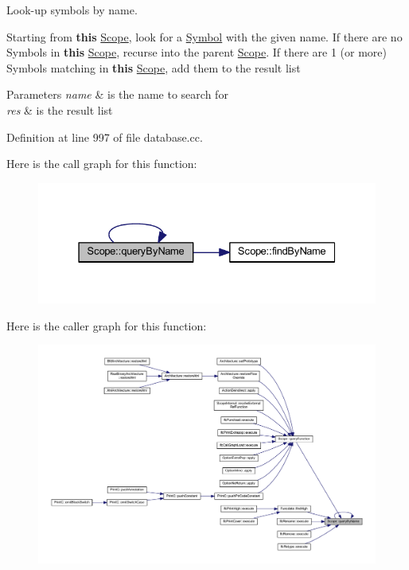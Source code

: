 Look-\/up symbols by name. 

Starting from {\bfseries{this}} \mbox{\hyperlink{class_scope}{Scope}}, look for a \mbox{\hyperlink{class_symbol}{Symbol}} with the given name. If there are no Symbols in {\bfseries{this}} \mbox{\hyperlink{class_scope}{Scope}}, recurse into the parent \mbox{\hyperlink{class_scope}{Scope}}. If there are 1 (or more) Symbols matching in {\bfseries{this}} \mbox{\hyperlink{class_scope}{Scope}}, add them to the result list 
\begin{DoxyParams}{Parameters}
{\em name} & is the name to search for \\
\hline
{\em res} & is the result list \\
\hline
\end{DoxyParams}


Definition at line 997 of file database.\+cc.

Here is the call graph for this function\+:
\nopagebreak
\begin{figure}[H]
\begin{center}
\leavevmode
\includegraphics[width=331pt]{class_scope_ae7d2e4eeed5fbc77e0477936f60cfde5_cgraph}
\end{center}
\end{figure}
Here is the caller graph for this function\+:
\nopagebreak
\begin{figure}[H]
\begin{center}
\leavevmode
\includegraphics[width=350pt]{class_scope_ae7d2e4eeed5fbc77e0477936f60cfde5_icgraph}
\end{center}
\end{figure}
\mbox{\label{class_scope_a88982df383433525505723b19b8aaa13}} 
